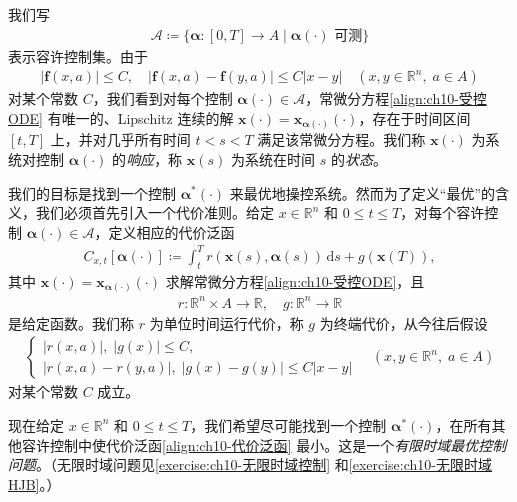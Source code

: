 \documentclass[../../main.tex]{subfiles}
\begin{document}
我们写
\begin{align}
\mathcal{A}\coloneqq\{\boldsymbol{\alpha}:[0,T]\to A\mid \boldsymbol{\alpha}(\cdot)\text{ 可测}\}
\label{align:ch10-容许控制集}
\end{align}
表示容许控制集。由于
\begin{align}
|\mathbf{f}(x,a)|\leqslant C,\quad |\mathbf{f}(x,a)-\mathbf{f}(y,a)|\leqslant C|x-y| \quad (x,y\in\mathbb{R}^n,\;a\in A)
\label{align:ch10-f的性质}
\end{align}
对某个常数 $C$，我们看到对每个控制 $\boldsymbol{\alpha}(\cdot)\in\mathcal{A}$，常微分方程\eqref{align:ch10-受控ODE} 有唯一的、Lipschitz 连续的解 $\mathbf{x}(\cdot)=\mathbf{x}_{\boldsymbol{\alpha}(\cdot)}(\cdot)$，存在于时间区间 $[t,T]$ 上，并对几乎所有时间 $t<s<T$ 满足该常微分方程。我们称 $\mathbf{x}(\cdot)$ 为系统对控制 $\boldsymbol{\alpha}(\cdot)$ 的\emph{响应}，称 $\mathbf{x}(s)$ 为系统在时间 $s$ 的\emph{状态}。

我们的目标是找到一个控制 $\boldsymbol{\alpha}^*(\cdot)$ 来最优地操控系统。然而为了定义``最优''的含义，我们必须首先引入一个代价准则。给定 $x\in\mathbb{R}^n$ 和 $0\leqslant t\leqslant T$，对每个容许控制 $\boldsymbol{\alpha}(\cdot)\in\mathcal{A}$，定义相应的代价泛函
\begin{align}
C_{x,t}[\boldsymbol{\alpha}(\cdot)]\coloneqq \int_t^T r(\mathbf{x}(s),\boldsymbol{\alpha}(s))\,\mathrm{d}s+g(\mathbf{x}(T)),
\label{align:ch10-代价泛函}
\end{align}
其中 $\mathbf{x}(\cdot)=\mathbf{x}_{\boldsymbol{\alpha}(\cdot)}(\cdot)$ 求解常微分方程\eqref{align:ch10-受控ODE}，且
\begin{align*}
r:\mathbb{R}^n\times A\to\mathbb{R},\quad g:\mathbb{R}^n\to\mathbb{R}
\end{align*}
是给定函数。我们称 $r$ 为单位时间运行代价，称 $g$ 为终端代价，从今往后假设
\begin{align}
\begin{cases}
|r(x,a)|,\;|g(x)|\leqslant C,\\
|r(x,a)-r(y,a)|,\;|g(x)-g(y)|\leqslant C|x-y|
\end{cases}
\quad (x,y\in\mathbb{R}^n,\;a\in A)
\label{align:ch10-代价假设}
\end{align}
对某个常数 $C$ 成立。

现在给定 $x\in\mathbb{R}^n$ 和 $0\leqslant t\leqslant T$，我们希望尽可能找到一个控制 $\boldsymbol{\alpha}^*(\cdot)$，在所有其他容许控制中使代价泛函\eqref{align:ch10-代价泛函} 最小。这是一个\emph{有限时域最优控制问题}。（无限时域问题见\cref{exercise:ch10-无限时域控制} 和\cref{exercise:ch10-无限时域HJB}。）
\end{document}
